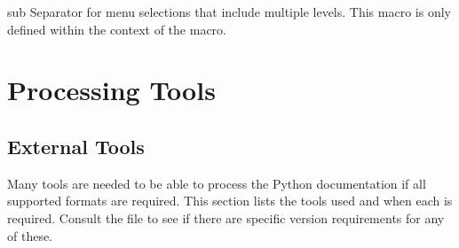 \documentclass{howto}
\begin{document}
  \begin{macrodesc}{sub}{}
    Separator for menu selections that include multiple levels.  This
    macro is only defined within the context of the
     macro.
  \end{macrodesc}


\section{Processing Tools \label{tools}}

  \subsection{External Tools \label{tools-external}}

    Many tools are needed to be able to process the Python
    documentation if all supported formats are required.  This
    section lists the tools used and when each is required.  Consult
    the  file to see if there are specific version
    requirements for any of these.
\end{document}
